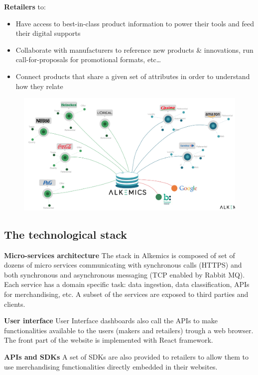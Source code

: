 \textbf{Retailers} to:
    \begin{itemize}
    \item Have access to best-in-class product information to power their tools and feed their digital supports 
    \item Collaborate with manufacturers to reference new products \& innovations, run call-for-proposals for promotional formats, etc…
    \item Connect products that share a given set of attributes in order to understand how they relate
    \end{itemize}

\begin{figure}[H]
\centering
\includegraphics[scale=0.35]{./images/introduction/with_alk.png}
\end{figure}


\subsection{The technological stack}

\textbf{Micro-services architecture}
The stack in Alkemics is composed of set of dozens of micro services communicating with synchronous calls (HTTPS) and both synchronous and asynchronous messaging (TCP enabled by Rabbit MQ).
Each service has a domain specific task: data ingestion, data classification, APIs for merchandising, etc. A subset of the services are exposed to third parties and clients.

\textbf{User interface}
User Interface dashboards also call the APIs to make functionalities available to the users (makers and retailers) trough a web browser.
The front part of the website is implemented with React framework.

\textbf{APIs and SDKs}
A set of SDKs are also provided to retailers to allow them to use merchandising functionalities directly embedded in their websites.

